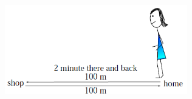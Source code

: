 \begin{enumerate}[noitemsep, label=\textbf{\arabic*}. ]
    \setcounter{subfigure}{0}


	\begin{figure}[H] %
    \begin{center}
    \label{m38791*id66785!!!underscore!!!media}\label{m38791*id66785!!!underscore!!!printimage}\includegraphics[width=300px]{col11305.imgs/m38791_PG10C2_016.png} %
        
      \vspace{2pt}
    \vspace{.1in}
    
    \end{center}

 \end{figure}   


\end{enumerate}
